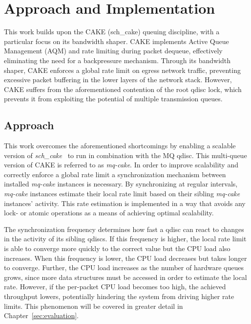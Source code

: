 \section{Approach and Implementation}
This work builds upon the CAKE (sch\_cake) queuing discipline, with a particular focus on its bandwidth shaper. CAKE implements Active Queue Management (AQM) and rate limiting during packet dequeue, effectively eliminating the need for a backpressure mechanism. Through its bandwidth shaper, CAKE enforces a global rate limit on egress network traffic, preventing excessive packet buffering in the lower layers of the network stack. However, CAKE suffers from the aforementioned contention of the root qdisc lock, which prevents it from exploiting the potential of multiple transmission queues.

\subsection{Approach}
This work overcomes the aforementioned shortcomings by enabling a scalable version of \textit{sch\_cake}~\cite{cake} to run in combination with the MQ qdisc.
%
This multi-queue version of CAKE is referred to as \textit{mq-cake}.
In order to improve scalability and correctly enforce a global rate limit a synchronization mechanism between installed \textit{mq-cake} instances is necessary.
%
By synchronizing at regular intervals, \textit{mq-cake} instances estimate their local rate limit based on their sibling \textit{mq-cake} instances' activity.  
%
This rate estimation is implemented in a way that avoids any lock- or atomic operations as a means of achieving optimal scalability.
%

The synchronization frequency determines how fast a qdisc can react to changes in the activity of its sibling qdiscs.
If this frequency is higher, the local rate limit is able to converge more quickly to the correct value but the CPU load also increases.
When this frequency is lower, the CPU load decreases but takes longer to converge.
%
Further, the CPU load increases as the number of hardware queues grows, since more data structures must be accessed in order to estimate the local rate.
%
However, if the per-packet CPU load becomes too high, the achieved throughput lowers, potentially hindering the system from driving higher rate limits.
This phenomenon will be covered in greater detail in Chapter~\ref{sec:evaluation}.

